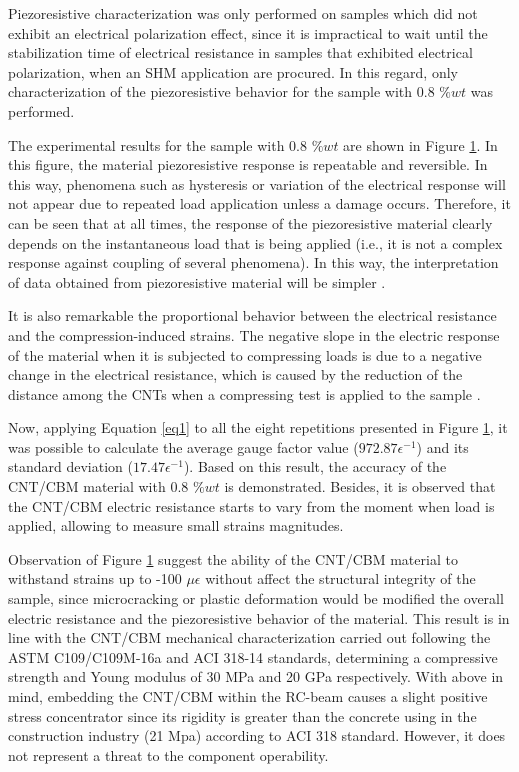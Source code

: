 \documentclass[twocolumn]{bmcart}%
\begin{document}
Piezoresistive characterization was only performed on samples which did not exhibit an electrical polarization effect, since it is impractical to wait until the stabilization time of electrical resistance in samples that exhibited electrical polarization, when an SHM application are procured. In this regard, only characterization of the piezoresistive behavior for the sample with 0.8 $\%wt$ was performed.

The experimental results for the sample with 0.8 $\%wt$ are shown in Figure \ref{fig10}. In this figure, the material piezoresistive response is repeatable and reversible. In this way, phenomena such as hysteresis or variation of the electrical response will not appear due to repeated load application unless a damage occurs.  Therefore, it can be seen that at all times, the response of the piezoresistive material clearly depends on the instantaneous load that is being applied (i.e., it is not a complex response against coupling of several phenomena). In this way, the interpretation of data obtained from piezoresistive material will be simpler \cite{Lagason2016}.

It is also remarkable the proportional behavior between the electrical resistance and the compression-induced strains. The negative slope in the electric response of the material when it is subjected to compressing loads is due to a negative change in the electrical resistance, which is caused by the reduction of the distance among the CNTs when a compressing test is applied to the sample \cite{DAlessandro2017}.


\begin{figure}[h!]
  \caption{
      }
      \label{fig10}
      \end{figure}


Now, applying Equation \ref{eq1} to all the eight repetitions presented in Figure \ref{fig10}, it was possible to calculate the average gauge factor value ($972.87\epsilon^{-1}$) and its standard deviation  ($17.47 \epsilon^{-1}$). Based on this result, the accuracy of the CNT/CBM material with 0.8 $\%wt$ is demonstrated. Besides, it is observed that the CNT/CBM electric resistance starts to vary from the moment when load is applied, allowing to measure small strains magnitudes.


Observation of Figure \ref{fig10} suggest the ability of the CNT/CBM material to withstand strains up to -100 $\mu \epsilon$  without affect the structural integrity of the sample, since microcracking or plastic deformation  would be modified the overall electric resistance and the piezoresistive behavior of the material. This result is in line with the CNT/CBM mechanical characterization carried out following the  ASTM C109/C109M-16a and ACI 318-14 standards, determining a compressive strength and Young modulus of 30 MPa and  20 GPa respectively. With above in mind, embedding the CNT/CBM within the RC-beam  causes a slight positive stress concentrator since its rigidity is greater than the concrete using in the construction industry (21 Mpa) according to ACI 318 standard. However, it does not represent a threat to the component operability. 
\end{document}
